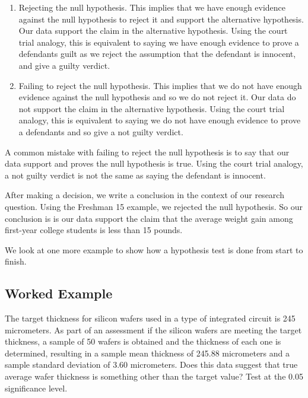 \documentclass[
]{book}
\begin{document}
\begin{enumerate}
\def\labelenumi{\arabic{enumi}.}
\item
  Rejecting the null hypothesis. This implies that we have enough evidence against the null hypothesis to reject it and support the alternative hypothesis. Our data support the claim in the alternative hypothesis. Using the court trial analogy, this is equivalent to saying we have enough evidence to prove a defendants guilt as we reject the assumption that the defendant is innocent, and give a guilty verdict.
\item
  Failing to reject the null hypothesis. This implies that we do not have enough evidence against the null hypothesis and so we do not reject it. Our data do not support the claim in the alternative hypothesis. Using the court trial analogy, this is equivalent to saying we do not have enough evidence to prove a defendants and so give a not guilty verdict.
\end{enumerate}

A common mistake with failing to reject the null hypothesis is to say that our data support and proves the null hypothesis is true. Using the court trial analogy, a not guilty verdict is not the same as saying the defendant is innocent.

After making a decision, we write a conclusion in the context of our research question. Using the Freshman 15 example, we rejected the null hypothesis. So our conclusion is is our data support the claim that the average weight gain among first-year college students is less than 15 pounds.

We look at one more example to show how a hypothesis test is done from start to finish.

\hypertarget{wafer}{%
\subsection{Worked Example}\label{wafer}}

The target thickness for silicon wafers used in a type of integrated circuit is 245 micrometers. As part of an assessment if the silicon wafers are meeting the target thickness, a sample of 50 wafers is obtained and the thickness of each one is determined, resulting in a sample mean thickness of 245.88 micrometers and a sample standard deviation of 3.60 micrometers. Does this data suggest that true average wafer thickness is something other than the target value? Test at the 0.05 significance level.
\end{document}
